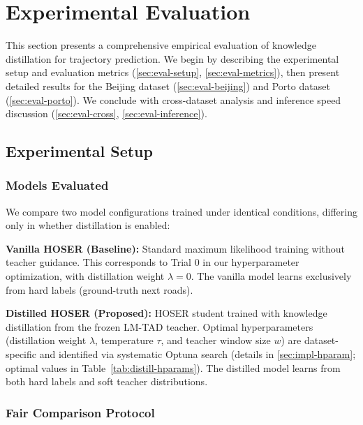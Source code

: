 
\section{Experimental Evaluation}
\label{sec:evaluation}

This section presents a comprehensive empirical evaluation of knowledge distillation for trajectory prediction. We begin by describing the experimental setup and evaluation metrics (\autoref{sec:eval-setup}, \autoref{sec:eval-metrics}), then present detailed results for the Beijing dataset (\autoref{sec:eval-beijing}) and Porto dataset (\autoref{sec:eval-porto}). We conclude with cross-dataset analysis and inference speed discussion (\autoref{sec:eval-cross}, \autoref{sec:eval-inference}).

\subsection{Experimental Setup}
\label{sec:eval-setup}

\subsubsection{Models Evaluated}

We compare two model configurations trained under identical conditions, differing only in whether distillation is enabled:

\textbf{Vanilla HOSER (Baseline):} Standard maximum likelihood training without teacher guidance. This corresponds to Trial 0 in our hyperparameter optimization, with distillation weight $\lambda = 0$. The vanilla model learns exclusively from hard labels (ground-truth next roads).

\textbf{Distilled HOSER (Proposed):} HOSER student trained with knowledge distillation from the frozen LM-TAD teacher. Optimal hyperparameters (distillation weight $\lambda$, temperature $\tau$, and teacher window size $w$) are dataset-specific and identified via systematic Optuna search (details in \autoref{sec:impl-hparam}; optimal values in Table~\ref{tab:distill-hparams}). The distilled model learns from both hard labels and soft teacher distributions.

\subsubsection{Fair Comparison Protocol}

